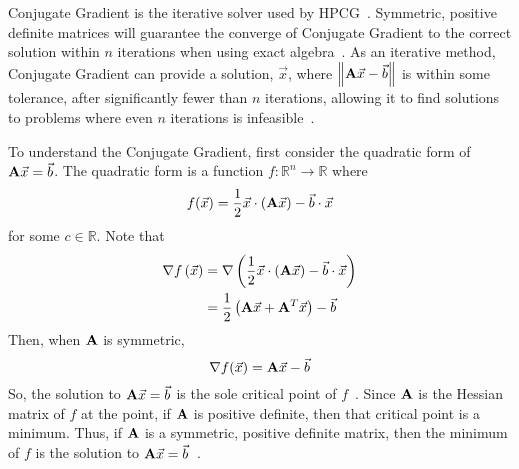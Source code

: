 Conjugate Gradient is the iterative solver used by HPCG~\cite{Dongarra:2015:HPCG}.
Symmetric, positive definite matrices will guarantee the converge of Conjugate Gradient to the correct solution within \(n\) iterations when using exact algebra~\cite{Saad:2003:IterativeMethods}.
As an iterative method, Conjugate Gradient can provide a solution, \(\vec{x}\), where \(\left\|\mathbf{A}\vec{x}-\vec{b}\right\|\) is within some tolerance, after significantly fewer than \(n\) iterations, allowing it to find solutions to problems where even \(n\) iterations is infeasible~\cite{Shewchuk:1994:IntroToCG}.

To understand the Conjugate Gradient, first consider the quadratic form of \(\mathbf{A}\vec{x} = \vec{b}\).
The quadratic form is a function \(f:\mathbb{R}^n\to\mathbb{R}\) where
\begin{equation}
\label{eq:quad-form}
	f(\vec{x}) = \frac{1}{2}\vec{x}\cdot\left(\mathbf{A}\vec{x}\right) - \vec{b}\cdot\vec{x}
\end{equation}
for some \(c\in\mathbb{R}\).
Note that
\begin{align*}
	\nabla f\left(\vec{x}\right)
	&= \nabla \left(\frac{1}{2}\vec{x}\cdot\left(\mathbf{A}\vec{x}\right) - \vec{b}\cdot\vec{x}\right) \\
	&= \frac{1}{2}\left(\mathbf{A}\vec{x}+\mathbf{A}^T\vec{x}\right)-\vec{b}
\end{align*}
Then, when \(\mathbf{A}\) is symmetric,
\begin{equation*}
	\nabla f(\vec{x}) = \mathbf{A}\vec{x} - \vec{b}
\end{equation*}
So, the solution to \(\mathbf{A}\vec{x} = \vec{b}\) is the sole critical point of \(f\)~\cite{Nearing:2010:toolsForPhysics}.
Since \(\mathbf{A}\) is the Hessian matrix of \(f\) at the point, if \(\mathbf{A}\) is positive definite, then that critical point is a minimum.
Thus, if \(\mathbf{A}\) is a symmetric, positive definite matrix, then the minimum of \(f\) is the solution to \(\mathbf{A}\vec{x} = \vec{b}\)~\cite{Shewchuk:1994:IntroToCG}.

